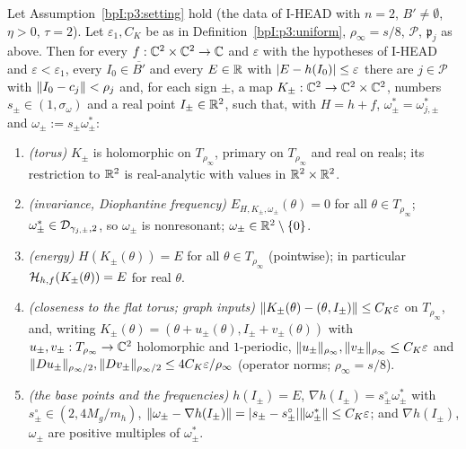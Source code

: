 \begin{proposition}\label{bpI:p3:tori}
Let Assumption~\ref{bpI:p3:setting} hold (the data of I-HEAD with $n=2$, $B'\ne\emptyset$, $\eta>0$, $\tau=2$). Let $\varepsilon_1,C_K$ be as in Definition~\ref{bpI:p3:uniform}, $\rho_\infty=s/8$,
$\mathcal P$, $\mathfrak p_j$ as above. Then for every $f:\mathbb{C}^2\times\mathbb{C}^2\to\mathbb{C}$ and $\varepsilon$ with the hypotheses of I-HEAD and $\varepsilon<\varepsilon_1$, every $I_0\in\overline{B'}$ and every $E\in\mathbb{R}$ with $\lvert E-h(I_0)\rvert\le\varepsilon$ there are
$j\in\mathcal P$ with $\lVert I_0-c_j\rVert<\rho_j$ and, for each sign $\pm$, a map $K_\pm:\mathbb{C}^2\to\mathbb{C}^2\times\mathbb{C}^2$, numbers $s_\pm\in(1,\sigma_\omega)$ and a real point $I_\pm\in\mathbb{R}^2$, such that, with $H=h+f$, $\omega^*_\pm=\omega^*_{j,\pm}$ and $\omega_\pm:=s_\pm\omega^*_\pm$:
\begin{enumerate}[label=(T\arabic*)]
\item\label{bpI:p3:T1} \emph{(torus)} $K_\pm$ is holomorphic on $T_{\rho_\infty}$, primary on $T_{\rho_\infty}$ and real on reals; its restriction to $\mathbb{R}^2$ is real-analytic with values in $\mathbb{R}^2\times\mathbb{R}^2$.
\item\label{bpI:p3:T2} \emph{(invariance, Diophantine frequency)} $E_{H,K_\pm,\omega_\pm}(\theta)=0$ for all $\theta\in T_{\rho_\infty}$; $\omega^*_\pm\in\mathcal{D}_{\gamma_{j,\pm},2}$, so $\omega_\pm$ is nonresonant; $\omega_\pm\in\mathbb{R}^2\setminus\{0\}$.
\item\label{bpI:p3:T3} \emph{(energy)} $H(K_\pm(\theta))=E$ for all $\theta\in T_{\rho_\infty}$ (pointwise); in particular $\mathcal H_{h,f}(K_\pm(\theta))=E$ for real $\theta$.
\item\label{bpI:p3:T4} \emph{(closeness to the flat torus; graph inputs)} $\lVert K_\pm(\theta)-(\theta,I_\pm)\rVert\le C_K\varepsilon$ on $T_{\rho_\infty}$, and, writing $K_\pm(\theta)=(\theta+u_\pm(\theta),I_\pm+v_\pm(\theta))$ with $u_\pm,v_\pm:T_{\rho_\infty}\to\mathbb{C}^2$ holomorphic and $1$-periodic,
$\lVert u_\pm\rVert_{\rho_\infty},\lVert v_\pm\rVert_{\rho_\infty}\le C_K\varepsilon$ and $\lVert Du_\pm\rVert_{\rho_\infty/2},\lVert Dv_\pm\rVert_{\rho_\infty/2}\le 4C_K\varepsilon/\rho_\infty$ (operator norms; $\rho_\infty=s/8$).
\item\label{bpI:p3:T5} \emph{(the base points and the frequencies)} $h(I_\pm)=E$, $\nabla h(I_\pm)=s^\circ_\pm\omega^*_\pm$ with $s^\circ_\pm\in(2,4M_g/m_h)$, $\lVert \omega_\pm-\nabla h(I_\pm)\rVert=\lvert s_\pm-s^\circ_\pm\rvert\lVert \omega^*_\pm\rVert\le C_K\varepsilon$; and $\nabla h(I_\pm)$, $\omega_\pm$ are positive multiples of $\omega^*_\pm$.

\end{enumerate}
\end{proposition}
